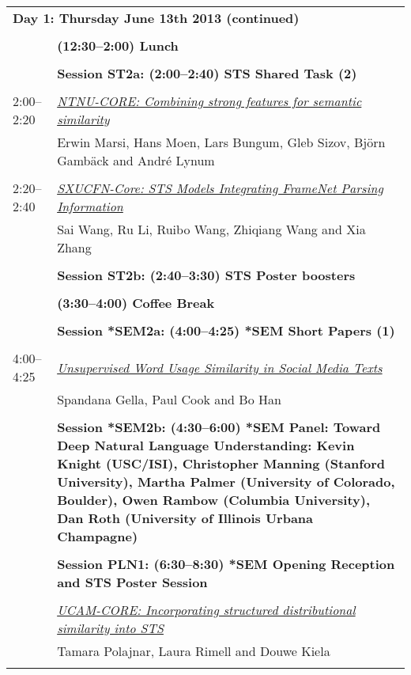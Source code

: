 \newpage
\begin{tabular}{p{20mm}p{138mm}}
\\
\multicolumn{2}{l}{\bf Day 1: Thursday June 13th 2013 (continued)} \\\\
 & {\bf (12:30--2:00) Lunch} \\
\\
 & {\bf Session ST2a: (2:00--2:40) STS Shared Task (2)} \\
\\
2:00--2:20 & \hyperlink{page.66}{\em NTNU-CORE: Combining strong features for semantic similarity}\\
         & Erwin Marsi, Hans Moen, Lars Bungum, Gleb Sizov, Bj\"{o}rn Gamb\"{a}ck and Andr\'{e} Lynum \\
\\

2:20--2:40 & \hyperlink{page.74}{\em SXUCFN-Core: STS Models Integrating FrameNet Parsing Information}\\
         & Sai Wang, Ru Li, Ruibo Wang, Zhiqiang Wang and Xia Zhang \\
\\

 & {\bf Session ST2b: (2:40--3:30) STS Poster boosters} \\
\\
 & {\bf (3:30--4:00) Coffee Break} \\
\\
 & {\bf Session *SEM2a: (4:00--4:25) *SEM Short Papers (1)} \\
\\
4:00--4:25 & \hyperlink{page.80}{\em Unsupervised Word Usage Similarity in Social Media Texts}\\
         & Spandana Gella, Paul Cook and Bo Han \\
\\

 & {\bf Session *SEM2b: (4:30--6:00) *SEM Panel: Toward Deep Natural Language Understanding: Kevin Knight (USC/ISI), Christopher Manning (Stanford University), Martha Palmer (University of Colorado, Boulder), Owen Rambow (Columbia University), Dan Roth (University of Illinois Urbana Champagne)} \\
\\
 & {\bf Session PLN1: (6:30--8:30) *SEM Opening Reception and STS Poster Session} \\
\\
 & \hyperlink{page.86}{\em UCAM-CORE: Incorporating structured distributional similarity into STS}\\
         & Tamara Polajnar, Laura Rimell and Douwe Kiela \\
\\


\end{tabular}
